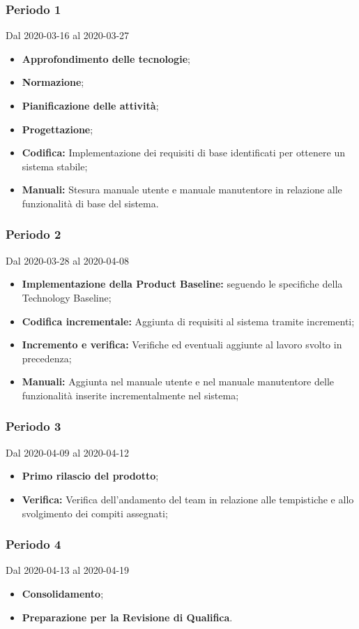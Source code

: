 \subsubsection{Periodo 1} 
Dal 2020-03-16 al 2020-03-27\\
\begin{itemize}
	\item \textbf{Approfondimento delle tecnologie};
	\item \textbf{Normazione};
	\item \textbf{Pianificazione delle attività};
	\item \textbf{Progettazione};
	\item \textbf{Codifica:} Implementazione dei requisiti di base identificati per ottenere un sistema stabile;
	\item \textbf{Manuali:} Stesura manuale utente e manuale manutentore in relazione alle funzionalità di base del sistema.
\end{itemize}
\subsubsection{Periodo 2} 
Dal 2020-03-28 al 2020-04-08\\
\begin{itemize}
	\item \textbf{Implementazione della Product Baseline:} seguendo le specifiche della Technology Baseline;
	\item \textbf{Codifica incrementale:} Aggiunta di requisiti al sistema tramite incrementi;
	\item \textbf{Incremento e verifica:} Verifiche ed eventuali aggiunte al lavoro svolto in precedenza;
	\item \textbf{Manuali:} Aggiunta nel manuale utente e nel manuale manutentore delle funzionalità inserite incrementalmente nel sistema;
\end{itemize}
\subsubsection{Periodo 3}
Dal 2020-04-09 al 2020-04-12\\
\begin{itemize}
	\item \textbf{Primo rilascio del prodotto};
	\item \textbf{Verifica:} Verifica dell'andamento del team in relazione alle tempistiche e allo svolgimento dei compiti assegnati;
\end{itemize}
\subsubsection{Periodo 4} 
Dal 2020-04-13 al 2020-04-19\\
\begin{itemize}
	\item \textbf{Consolidamento};
	\item \textbf{Preparazione per la Revisione di Qualifica}.
\end{itemize}


